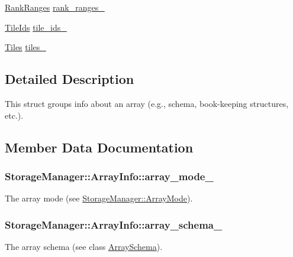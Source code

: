 \begin{DoxyCompactItemize}
\item 
\hyperlink{classStorageManager_a926373393192b47df3a56bde96756fe4}{Rank\+Ranges} \hyperlink{structStorageManager_1_1ArrayInfo_af758a081c7584aed42a93693f92f3115}{rank\+\_\+ranges\+\_\+}
\item 
\hyperlink{classStorageManager_aa5b363e1fee4e3a9030d4cb3edf5db9b}{Tile\+Ids} \hyperlink{structStorageManager_1_1ArrayInfo_ae3b3ba9aaa9866f00897ec68ead6027d}{tile\+\_\+ids\+\_\+}
\item 
\hyperlink{classStorageManager_a2eb2f058a32a6279eaa277bcacdc663f}{Tiles} \hyperlink{structStorageManager_1_1ArrayInfo_afa92dcd8efd689d609d19ee65d5b1699}{tiles\+\_\+}
\end{DoxyCompactItemize}


\subsection{Detailed Description}
This struct groups info about an array (e.\+g., schema, book-\/keeping structures, etc.). 

\subsection{Member Data Documentation}
\hypertarget{structStorageManager_1_1ArrayInfo_a6563b5e958b9abf0971dd6efa82ff330}{}
\subsubsection[{array\+\_\+mode\+\_\+}]{ Storage\+Manager\+::\+Array\+Info\+::array\+\_\+mode\+\_\+}\label{structStorageManager_1_1ArrayInfo_a6563b5e958b9abf0971dd6efa82ff330}
The array mode (see \hyperlink{classStorageManager_a283b60c689883bc7c343ffbf1de8fc3d}{Storage\+Manager\+::\+Array\+Mode}). \hypertarget{structStorageManager_1_1ArrayInfo_a493f3c1795042afdaecc997ab6878cb8}{}
\subsubsection[{array\+\_\+schema\+\_\+}]{ Storage\+Manager\+::\+Array\+Info\+::array\+\_\+schema\+\_\+}\label{structStorageManager_1_1ArrayInfo_a493f3c1795042afdaecc997ab6878cb8}
The array schema (see class \hyperlink{classArraySchema}{Array\+Schema}). \hypertarget{structStorageManager_1_1ArrayInfo_a1826af77bebd82f8f6996633893016ae}{}
